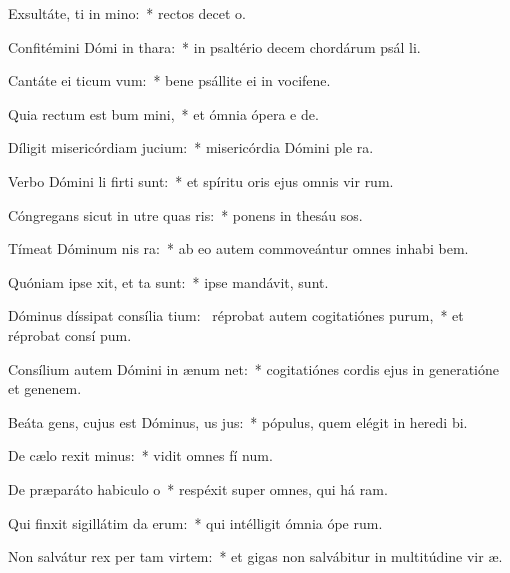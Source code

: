 \item Exsultáte, ti in mino:~* rectos decet o.
\item Confitémini Dómi in thara:~* in psaltério decem chordárum psál li.
\item Cantáte ei ticum vum:~* bene psállite ei in vocifene.
\item Quia rectum est bum mini,~* et ómnia ópera e  de.
\item Díligit misericórdiam  jucium:~* misericórdia Dómini ple  ra.
\item Verbo Dómini li firti sunt:~* et spíritu oris ejus omnis vir rum.
\item Cóngregans sicut in utre quas ris:~* ponens in thesáu sos.
\item Tímeat Dóminum nis ra:~* ab eo autem commoveántur omnes inhabi bem.
\item Quóniam ipse xit, et ta sunt:~* ipse mandávit,   sunt.
\item Dóminus díssipat consília tium:~\pscross{} réprobat autem cogitatiónes purum,~* et réprobat consí pum.
\item Consílium autem Dómini in ænum net:~* cogitatiónes cordis ejus in generatióne et genenem.
\item Beáta gens, cujus est Dóminus, us jus:~* pópulus, quem elégit in heredi bi.
\item De cælo rexit minus:~* vidit omnes fí num.
\item De præparáto habiculo o~* respéxit super omnes, qui há ram.
\item Qui finxit sigillátim da erum:~* qui intélligit ómnia ópe rum.
\item Non salvátur rex per tam virtem:~* et gigas non salvábitur in multitúdine vir æ.
